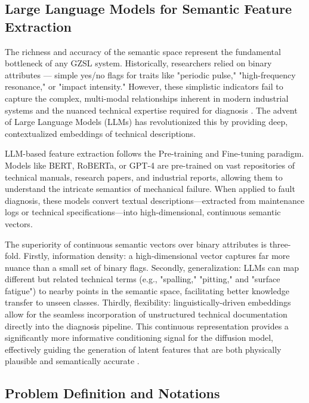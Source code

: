\documentclass[journal]{IEEEtran}
\begin{document}
\subsection{Large Language Models for Semantic Feature Extraction}
\label{subsec:llm_semantic}

The richness and accuracy of the semantic space represent the fundamental bottleneck of any GZSL system. Historically, researchers relied on binary attributes — simple yes/no flags for traits like "periodic pulse," "high-frequency resonance," or "impact intensity." However, these simplistic indicators fail to capture the complex, multi-modal relationships inherent in modern industrial systems and the nuanced technical expertise required for diagnosis \cite{devlin2018bert}. The advent of Large Language Models (LLMs) has revolutionized this by providing deep, contextualized embeddings of technical descriptions.

LLM-based feature extraction follows the Pre-training and Fine-tuning paradigm. Models like BERT, RoBERTa, or GPT-4 are pre-trained on vast repositories of technical manuals, research papers, and industrial reports, allowing them to understand the intricate semantics of mechanical failure. When applied to fault diagnosis, these models convert textual descriptions—extracted from maintenance logs or technical specifications—into high-dimensional, continuous semantic vectors.

The superiority of continuous semantic vectors over binary attributes is three-fold. Firstly, information density: a high-dimensional vector captures far more nuance than a small set of binary flags. Secondly, generalization: LLMs can map different but related technical terms (e.g., "spalling," "pitting," and "surface fatigue") to nearby points in the semantic space, facilitating better knowledge transfer to unseen classes. Thirdly, flexibility: linguistically-driven embeddings allow for the seamless incorporation of unstructured technical documentation directly into the diagnosis pipeline. This continuous representation provides a significantly more informative conditioning signal for the diffusion model, effectively guiding the generation of latent features that are both physically plausible and semantically accurate \cite{brown2020language}.

\subsection{Problem Definition and Notations}
\label{subsec:problem_definition}
\end{document}
